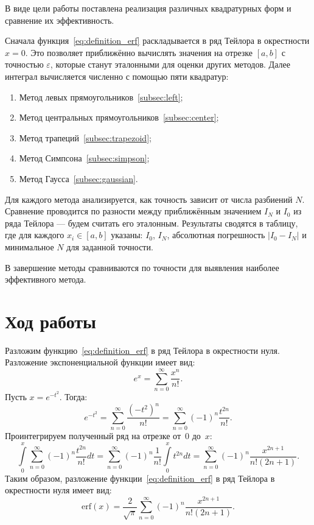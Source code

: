 \documentclass[a4paper, 14pt]{extarticle}
\begin{document}
    В виде цели работы поставлена реализация различных квадратурных
    форм и сравнение их эффективность.

    Сначала функция~\eqref{eq:definition_erf} раскладывается в ряд Тейлора в окрестности $x = 0$.
    Это позволяет приближённо вычислять значения на отрезке $[a, b]$ с точностью $\varepsilon$,
    которые станут эталонными для оценки других методов.
    Далее интеграл вычисляется численно с помощью пяти квадратур:
    \begin{enumerate}
        \item Метод левых прямоугольников~\ref{subsec:left};
        \item Метод центральных прямоугольников~\ref{subsec:center};
        \item Метод трапеций~\ref{subsec:trapezoid};
        \item Метод Симпсона~\ref{subsec:simpson};
        \item Метод Гаусса~\ref{subsec:gaussian}.
    \end{enumerate}

    Для каждого метода анализируется, как точность зависит от числа разбиений $N$.
    Сравнение проводится по разности между приближённым значением $I_N$ и $I_0$ из ряда Тейлора
    --- будем считать его эталонным.
    Результаты сводятся в таблицу, где для каждого $x_i \in [a, b]$ указаны:
    $I_0$, $I_N$, абсолютная погрешность $|I_0 - I_N|$ и минимальное $N$ для заданной точности.

    В завершение методы сравниваются по точности для выявления наиболее эффективного метода.\newpage


    \section{Ход работы}\label{sec:-}
    Разложим функцию~\eqref{eq:definition_erf} в ряд Тейлора в окрестности нуля.
    Разложение экспоненциальной функции имеет вид:
    $$ e^x = \sum\limits_{n=0}^{\infty} \frac{x^n}{n!}. $$
    Пусть $x = e^{-t^2}.$ Тогда:
    $$ e^{-t^2} = \sum\limits_{n=0}^{\infty} \frac{(-t^2)^n}{n!} = \sum\limits_{n=0}^{\infty} (-1)^n \frac{t^{2n}}{n!}. $$
    Проинтегрируем полученный ряд на отрезке от~$0$ до~$x$:
    $$ \int\limits_0^x \sum\limits_{n=0}^{\infty} (-1)^n \frac{t^{2n}}{n!} dt = \sum\limits_{n=0}^{\infty} (-1)^n \frac{1}{n!} \int\limits_0^x t^{2n}dt = \sum\limits_{n=0}^{\infty} (-1)^n \frac{x^{2n+1}}{n!(2n+1)}. $$
    Таким образом, разложение функции~\eqref{eq:definition_erf} в ряд Тейлора в окрестности нуля имеет вид:
    \begin{equation}
        \label{eq:Taylor_erf}
        \mathrm{erf}(x) = \frac{2}{\sqrt{\pi}} \sum\limits_{n=0}^{\infty} (-1)^n \frac{x^{2n+1}}{n!(2n+1)}.
    \end{equation}
\end{document}
